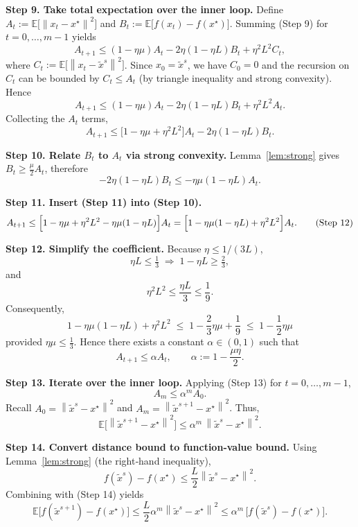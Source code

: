 \documentclass{article}
\newcommand{\E}{\mathbb{E}}
\newcommand{\norm}[1]{\left\|#1\right\|}
\begin{document}
\noindent\textbf{Step 9. Take total expectation over the inner loop.}  
Define $A_t:=\E\!\bigl[\norm{x_t-x^{\star}}^{2}\bigr]$ and $B_t:=\E\!\bigl[f(x_t)-f(x^{\star})\bigr]$.
Summing (Step 9) for $t=0,\dots,m-1$ yields
\[
A_{t+1}\le (1-\eta\mu)A_t-2\eta(1-\eta L)B_t+\eta^{2}L^{2}C_t,
\]
where $C_t:=\E\!\bigl[\norm{x_t-\tilde{x}^{s}}^{2}\bigr]$.
Since $x_0=\tilde{x}^{s}$, we have $C_0=0$ and the recursion on $C_t$ can be bounded by $C_t\le A_t$ (by triangle inequality and strong convexity). Hence
\[
A_{t+1}\le (1-\eta\mu)A_t-2\eta(1-\eta L)B_t+\eta^{2}L^{2}A_t.
\]
Collecting the $A_t$ terms,
\[
A_{t+1}\le \bigl[1-\eta\mu+\eta^{2}L^{2}\bigr]A_t-2\eta(1-\eta L)B_t. \tag{Step 10}
\]

\noindent\textbf{Step 10. Relate $B_t$ to $A_t$ via strong convexity.}  
Lemma~\ref{lem:strong} gives $B_t\ge \frac{\mu}{2}A_t$, therefore
\[
-2\eta(1-\eta L)B_t\le -\eta\mu(1-\eta L)A_t. \tag{Step 11}
\]

\noindent\textbf{Step 11. Insert (Step 11) into (Step 10).}
\[
A_{t+1}\le \Bigl[1-\eta\mu+\eta^{2}L^{2}-\eta\mu(1-\eta L)\Bigr]A_t
= \Bigl[1-\eta\mu(1-\eta L)+\eta^{2}L^{2}\Bigr]A_t. \tag{Step 12}
\]

\noindent\textbf{Step 12. Simplify the coefficient.}
Because $\eta\le 1/(3L)$,
\[
\eta L\le \tfrac13\;\Longrightarrow\;1-\eta L\ge \tfrac23,
\]
and
\[
\eta^{2}L^{2}\le \frac{\eta L}{3}\le \frac{1}{9}.
\]
Consequently,
\[
1-\eta\mu(1-\eta L)+\eta^{2}L^{2}
\;\le\; 1-\frac{2}{3}\eta\mu+\frac{1}{9}
\;\le\; 1-\frac{1}{2}\eta\mu
\]
provided $\eta\mu\le \frac{1}{3}$.  Hence there exists a constant $\alpha\in(0,1)$ such that
\[
A_{t+1}\le \alpha A_t,\qquad \alpha:=1-\frac{\mu\eta}{2}. \tag{Step 13}
\]

\noindent\textbf{Step 13. Iterate over the inner loop.}  
Applying (Step 13) for $t=0,\dots,m-1$,
\[
A_{m}\le \alpha^{m}A_{0}.
\]
Recall $A_{0}= \norm{\tilde{x}^{s}-x^{\star}}^{2}$ and $A_{m}= \norm{\tilde{x}^{s+1}-x^{\star}}^{2}$.
Thus,
\[
\E\!\bigl[\norm{\tilde{x}^{s+1}-x^{\star}}^{2}\bigr]\le \alpha^{m}\,\norm{\tilde{x}^{s}-x^{\star}}^{2}. \tag{Step 14}
\]

\noindent\textbf{Step 14. Convert distance bound to function‑value bound.}
Using Lemma~\ref{lem:strong} (the right‑hand inequality),
\[
f(\tilde{x}^{s})-f(x^{\star})\le \frac{L}{2}\norm{\tilde{x}^{s}-x^{\star}}^{2}.
\]
Combining with (Step 14) yields
\[
\E\!\bigl[f(\tilde{x}^{s+1})-f(x^{\star})\bigr]
\le \frac{L}{2}\alpha^{m}\norm{\tilde{x}^{s}-x^{\star}}^{2}
\le \alpha^{m}\,\bigl[f(\tilde{x}^{s})-f(x^{\star})\bigr]. \tag{Step 15}
\]
\end{document}
